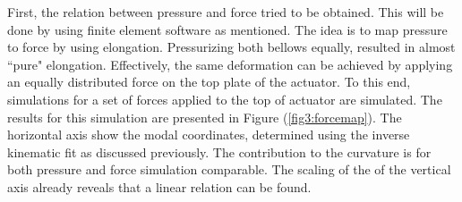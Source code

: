 First, the relation between pressure and force tried to be obtained. This will be done by using finite element software as mentioned. The idea is to map pressure to force by using elongation. Pressurizing both bellows equally, resulted in almost ``pure" elongation. Effectively, the same deformation can be achieved by applying an equally distributed force on the top plate of the actuator. To this end, simulations for a set of forces applied to the top of actuator are simulated. The results for this simulation are presented in Figure (\ref{fig3:forcemap}). The horizontal axis show the modal coordinates, determined using the inverse kinematic fit as discussed previously. The contribution to the curvature is for both pressure and force simulation comparable. The scaling of the of the vertical axis already reveals that a linear relation can be found.
\newpage

